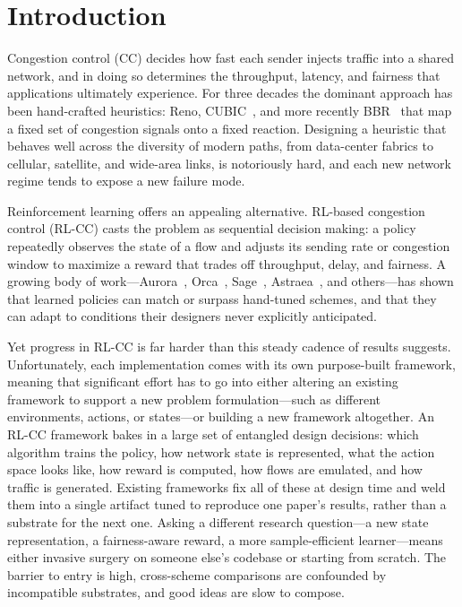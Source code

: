 \section{Introduction}

Congestion control (CC) decides how fast each sender injects traffic into a
shared network, and in doing so determines the throughput, latency, and
fairness that applications ultimately experience. For three decades the
dominant approach has been hand-crafted heuristics: Reno, CUBIC~\cite{cubic},
and more recently BBR~\cite{bbr} that map a fixed set of congestion signals
onto a fixed reaction. Designing a heuristic that behaves well across the
diversity of modern paths, from data-center fabrics to cellular, satellite, and
wide-area links, is notoriously hard, and each new network regime tends to
expose a new failure mode.

Reinforcement learning offers an appealing alternative. RL-based congestion
control (RL-CC) casts the problem as sequential decision making: a policy
repeatedly observes the state of a flow and adjusts its sending rate or
congestion window to maximize a reward that trades off throughput, delay, and
fairness. A growing body of work---Aurora~\cite{aurora}, Orca~\cite{orca},
Sage~\cite{sage}, Astraea~\cite{astraea}, and others---has shown that learned
policies can match or surpass hand-tuned schemes, and that they can adapt to
conditions their designers never explicitly anticipated.

Yet progress in RL-CC is far harder than this steady cadence of results
suggests. Unfortunately, each implementation comes with its own purpose-built
framework, meaning that significant effort has to go into either altering an
existing framework to support a new problem formulation---such as different
environments, actions, or states---or building a new framework altogether. An
RL-CC framework bakes in a large set of entangled design decisions: which
algorithm trains the policy, how network state is represented, what the action
space looks like, how reward is computed, how flows are emulated, and how
traffic is generated. Existing frameworks fix all of these at design time and
weld them into a single artifact tuned to reproduce one paper's results, rather
than a substrate for the next one. Asking a different research question---a new
state representation, a fairness-aware reward, a more sample-efficient
learner---means either invasive surgery on someone else's codebase or starting
from scratch. The barrier to entry is high, cross-scheme comparisons are
confounded by incompatible substrates, and good ideas are slow to compose.

